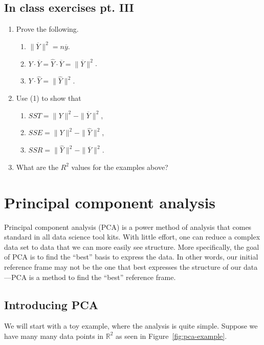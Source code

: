 \documentclass[a4paper, 12pt]{article}
\numberwithin{equation}{section}
\numberwithin{figure}{section}
\theoremstyle{definition}
\newcommand{\R}{\mathbb{R}}
\begin{document}
\subsection{In class exercises pt. III}

\begin{enumerate}
	\item Prove the following.
	\begin{enumerate}
		\item $\| \overline{Y} \|^2 = n\overline{y}$.
		\item $Y \cdot \overline{Y} = \widehat{Y}\cdot \overline{Y} = \| \overline{Y} \|^2$.
		\item $Y\cdot \widehat{Y} = \| \widehat{Y} \|^2$.
	\end{enumerate}
	\item Use (1) to show that 
	\begin{enumerate}
		\item $SST = \|Y\|^2 - \|\overline{Y}\|^2$,
		\item $SSE = \|Y\|^2 - \| \widehat{Y} \|^2$,
		\item $SSR = \| \widehat{Y} \|^2 - \| \overline{Y} \|^2$.
	\end{enumerate}
	\item What are the $R^2$ values for the examples above?
\end{enumerate}

\section{Principal component analysis}

Principal component analysis (PCA) is a power method of analysis that comes
standard in all data science tool kits. With little effort, one can reduce a
complex data set to data that we can more easily see structure. More
specifically, the goal of PCA is to find the ``best'' basis to express the data.
In other words, our initial reference frame may not be the one that best
expresses the structure of our data---PCA is a method to find the ``best''
reference frame.

\subsection{Introducing PCA}

We will start with a toy example, where the analysis is quite simple. Suppose we
have many many data points in $\R^2$ as seen in Figure~\ref{fig:pca-example}.
\end{document}
